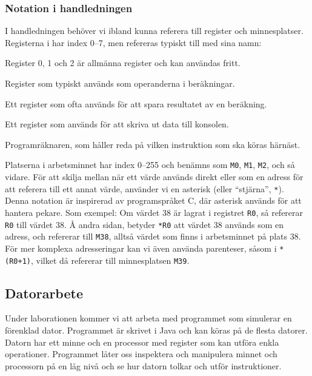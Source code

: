 \subsubsection{Notation i handledningen}
I handledningen behöver vi ibland kunna referera till register och minnesplatser. Registerna i \CPUprogname{} har index 0--7, men refereras typiskt till med sina namn:

\begin{description}[leftmargin=20mm]
    \item[\texttt{R0}--\texttt{R2}] Register 0, 1 och 2 är allmänna register och kan användas fritt.
    \item[\texttt{OP1}, \texttt{OP2}] Register som typiskt används som operanderna i beräkningar.
    \item[\texttt{RES}] Ett register som ofta används för att spara resultatet av en beräkning.
    \item[\texttt{OUT}] Ett register som används för att skriva ut data till konsolen.
    \item[\texttt{PC}] Programräknaren, som håller reda på vilken instruktion som ska köras härnäst.
\end{description}

Platserna i arbetsminnet har index 0--255 och benämns som \texttt{M0}, \texttt{M1}, \texttt{M2}, och så vidare. För att skilja mellan när ett värde används direkt eller som en adress för att referera till ett annat värde, använder vi en asterisk (eller \enquote{stjärna}, \texttt{*}). Denna notation är inspirerad av programspråket C, där asterisk används för att hantera pekare. Som exempel: Om värdet 38 är lagrat i registret \texttt{R0}, så refererar \texttt{R0} till värdet 38. Å andra sidan, betyder \texttt{*R0} att värdet 38 används som en adress, och refererar till \texttt{M38}, alltså värdet som finns i arbetsminnet på plats 38. För mer komplexa adresseringar kan vi även använda parenteser, såsom i \texttt{*(R0+1)}, vilket då refererar till minnesplatsen \texttt{M39}.


\subsection{Datorarbete}
Under laborationen kommer vi att arbeta med programmet \CPUprogname{} som simulerar en förenklad dator. Programmet är skrivet i Java och kan köras på de flesta datorer. Datorn har ett minne och en processor med register som kan utföra enkla operationer. Programmet låter oss inspektera och manipulera minnet och processorn på en låg nivå och se hur datorn tolkar och utför instruktioner.

